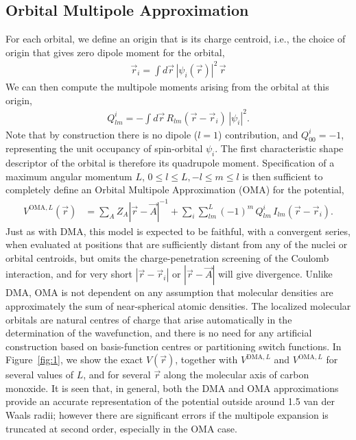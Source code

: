 \documentclass[journal=jacsat,manuscript=article]{achemso}
\begin{document}
\subsection{Orbital Multipole Approximation}

For each orbital, we define an origin that is its charge centroid, i.e., the
choice of origin that gives zero dipole moment for the orbital,
\begin{align}
  \vec r_i = \int d \vec r \,|\psi_i(\vec r)|^2 \,  \vec r
\end{align}
We can then compute the multipole moments arising from the orbital at this origin,
\begin{align}
    Q^i_{lm} = -\int d\vec r \, R_{lm}(\vec r-\vec r_i) \, |\psi_i|^2
    .
\end{align}
Note that by construction there is no dipole ($l=1$) contribution, and $Q^i_{00}=-1$, representing the unit occupancy of spin-orbital $\psi_i$. The first characteristic shape descriptor of the orbital is therefore its quadrupole moment.
Specification of a maximum angular momentum $L$, $0\le l\le L, -l\le m\le l$ is then sufficient to completely define an Orbital Multipole Approximation (OMA) for the potential,
\begin{align}
    V^{\text{OMA},L}(\vec r) &=
    \sum_A Z_A |\vec r
    - \vec A|^{-1}
    +\sum_i \sum_{lm}^L(-1)^m\, Q^i_{lm}\, I_{lm}(\vec r - \vec r_i)
    .
\end{align}
Just as with DMA, this model is expected to be faithful, with a convergent series, when evaluated at positions that are sufficiently distant from any of the nuclei or orbital centroids, but omits the
charge-penetration screening of the Coulomb interaction, and for very short $|\vec r-\vec r_i|$ or $|\vec r-\vec A|$ will give divergence. Unlike DMA, OMA is not dependent on any assumption that molecular densities are approximately the sum of near-spherical atomic densities. The localized molecular orbitals are natural centres of charge that arise automatically in the determination of the wavefunction, and there is no need for any artificial construction based
on basis-function centres\cite{Stone1981} or partitioning switch functions\cite{Stone2005}.
In Figure~\ref{fig:1}, we show the exact $V(\vec r)$, together with
$V^{\text{DMA},L}$ and
$V^{\text{OMA},L}$ for several values of $L$, and for several $\vec r$ along the molecular axis of carbon monoxide.
It is seen that, in general, both the DMA and OMA approximations provide an accurate representation of the potential outside around 1.5 van der Waals radii; however there are significant errors if the multipole expansion is truncated at second order, especially in the OMA case.
\end{document}
